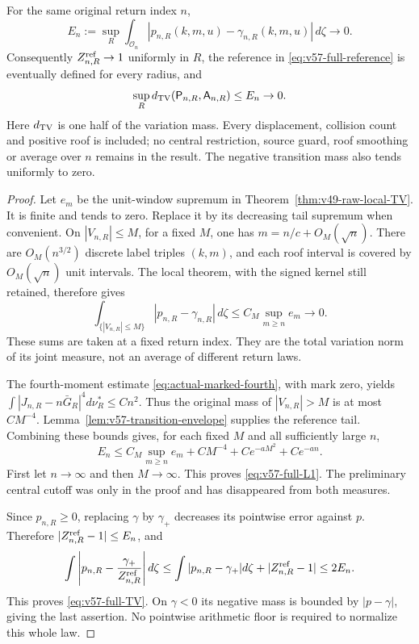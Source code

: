 \begin{theorem}
\label{thm:v57-global-raw-TV}
For the same original return index $n$,
\begin{equation}\label{eq:v57-full-L1}
 E_n:=\sup_R\int_{\mathcal O_n}
              |p_{n,R}(k,m,u)-\gamma_{n,R}(k,m,u)|\,d\zeta
                                                   \longrightarrow0.
\end{equation}
Consequently $Z_{n,R}^{\rm ref}\to1$ uniformly in $R$, the reference
in \eqref{eq:v57-full-reference} is eventually defined for every
radius, and
\begin{equation}\label{eq:v57-full-TV}
 \sup_R d_{\rm TV}(\mathsf P_{n,R},\mathsf A_{n,R})\le E_n\to0.
\end{equation}
Here $d_{\rm TV}$ is one half of the variation mass. Every displacement,
collision count and positive roof is included; no central restriction,
source guard, roof smoothing or average over $n$ remains in the result.
The negative transition mass also tends uniformly to zero.
\end{theorem}
\begin{proof}
Let $e_m$ be the unit-window supremum in
Theorem~\ref{thm:v49-raw-local-TV}. It is finite and tends to zero.
Replace it by its decreasing tail supremum when convenient. On
$|V_{n,R}|\le M$, for a fixed $M$, one has $m=n/c+O_M(\sqrt n)$.
There are $O_M(n^{3/2})$ discrete label triples $(k,m)$, and each
roof interval is covered by $O_M(\sqrt n)$ unit intervals. The
local theorem, with the signed kernel still retained, therefore gives
\begin{equation}\label{eq:v57-central-error}
 \int_{\{|V_{n,R}|\le M\}}|p_{n,R}-\gamma_{n,R}|\,d\zeta
                         \le C_M\sup_{m\ge n}e_m\longrightarrow0.
\end{equation}
These sums are taken at a fixed return index. They are the total
variation norm of its joint measure, not an average of different
return laws.

The fourth-moment estimate \eqref{eq:actual-marked-fourth}, with mark
zero, yields
$\int|J_{n,R}-n\bar G_R|^4d\nu_R^*\le Cn^2$.
Thus the original mass of $|V_{n,R}|>M$ is at most $CM^{-4}$.
Lemma~\ref{lem:v57-transition-envelope} supplies the reference tail.
Combining these bounds gives, for each fixed $M$ and all sufficiently
large $n$,
\[
 E_n\le C_M\sup_{m\ge n}e_m+CM^{-4}+Ce^{-aM^2}+Ce^{-an}.
\]
First let $n\to\infty$ and then $M\to\infty$. This proves
\eqref{eq:v57-full-L1}. The preliminary central cutoff was only
in the proof and has disappeared from both measures.

Since $p_{n,R}\ge0$, replacing $\gamma$ by $\gamma_+$ decreases
its pointwise error against $p$. Therefore
$|Z_{n,R}^{\rm ref}-1|\le E_n$, and
\[
 \int\left|p_{n,R}-\frac{\gamma_+}{Z_{n,R}^{\rm ref}}\right|d\zeta
 \le\int|p_{n,R}-\gamma_+|d\zeta+|Z_{n,R}^{\rm ref}-1|
 \le2E_n.
\]
This proves \eqref{eq:v57-full-TV}. On $\gamma<0$ its negative
mass is bounded by $|p-\gamma|$, giving the last assertion.
No pointwise arithmetic floor is required to normalize this whole law.
\end{proof}

